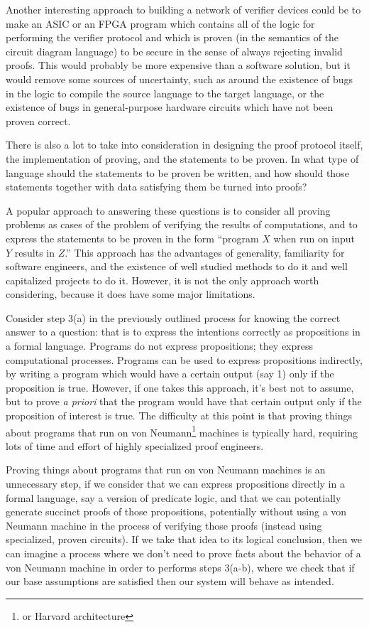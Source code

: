 \documentclass[11pt]{article}
\begin{document}
Another interesting approach to building a network of verifier devices could be to
make an ASIC or an FPGA program which contains all of the logic for
performing the verifier protocol and which is proven (in the semantics of the circuit diagram
language) to be secure in the sense of always rejecting invalid proofs. This would
probably be more expensive than a software solution, but it would remove some sources
of uncertainty, such as around the existence of bugs in the logic to compile the source
language to the target language, or the existence of bugs in general-purpose hardware
circuits which have not been proven correct.

There is also a lot to take into consideration in designing the proof protocol itself,
the implementation of proving, and the statements to be proven. In what type of language
should the statements to be proven be written, and how should those statements together
with data satisfying them be turned into proofs?

A popular approach to answering these questions is to consider all proving problems
as cases of the problem of verifying the results of computations, and to express the
statements to be proven in the form ``program $X$ when run on input $Y$ results in $Z$.''
This approach has the advantages of generality, familiarity for software engineers, and the
existence of well studied methods to do it and well capitalized projects to do it.
However, it is not the only approach worth considering, because it does have some
major limitations. 

Consider step 3(a) in the previously outlined process for knowing the correct answer
to a question: that is to express the intentions correctly as propositions in a formal
language. Programs do not express propositions; they express computational processes.
Programs can be used to express propositions indirectly, by writing a program which
would have a certain output (say 1) only if the proposition is true. However, if one
takes this approach, it's best not to assume, but to prove \emph{a priori}\/ that
the program would have that certain output only if the proposition of interest is true.
The difficulty at this point is that proving things about programs that run on von
Neumann\footnote{or Harvard architecture} machines is typically hard, requiring
lots of time and effort of highly specialized proof engineers.

Proving things about programs that run on von Neumann machines is an unnecessary step,
if we consider that we can express propositions directly in a formal language, say a
version of predicate logic, and that we can potentially generate succinct proofs of
those propositions, potentially without using a von Neumann machine in the process
of verifying those proofs (instead using specialized, proven circuits). If we take
that idea to its logical conclusion, then we can imagine a process where we don't need
to prove facts about the behavior of a von Neumann machine in order to performs steps
3(a-b), where we check that if our base assumptions are satisfied then our system
will behave as intended.
\end{document}
